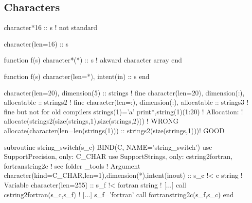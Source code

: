 \documentclass{article}
\begin{document}
\subsection{Characters}
\label{sec:characters}
\begin{codea}
character*16 :: s ! not standard
\end{codea} 
\begin{codeb}
character(len=16) :: s
\end{codeb}
\begin{codea}
function f(s)
  character*(*) :: s ! akward character array
end
\end{codea} 
\begin{codeb}
function f(s)
  character(len=*), intent(in) :: s
end
\end{codeb}

\begin{codefull}
character(len=20), dimension(5)              :: strings  ! fine
character(len=20), dimension(:), allocatable :: strings2 ! fine 
character(len=:),  dimension(:), allocatable :: strings3 ! fine but not for old compilers
strings(1)='a'
print*,string(1)(1:20)
! Allocation: 
! allocate(strings2(size(strings,1),size(strings,2)))                ! WRONG
allocate(character(len=len(strings(1))) :: strings2(size(strings,1)))! GOOD
\end{codefull}\par 
\begin{codefull}
subroutine string_switch(s_c) BIND(C, NAME='string_switch')
    use SupportPrecision, only: C_CHAR
    use SupportStrings, only: cstring2fortran, fortranstring2c ! see folder _tools
    ! Argument
    character(kind=C_CHAR,len=1),dimension(*),intent(inout) :: s_c !< c string
    ! Variable
    character(len=255) :: s_f   !< fortran string
    ! [...]
    call cstring2fortran(s_c,s_f)
    ! [...]
    s_f='fortran'
    call fortranstring2c(s_f,s_c)
end 
\end{codefull}


\end{document}
